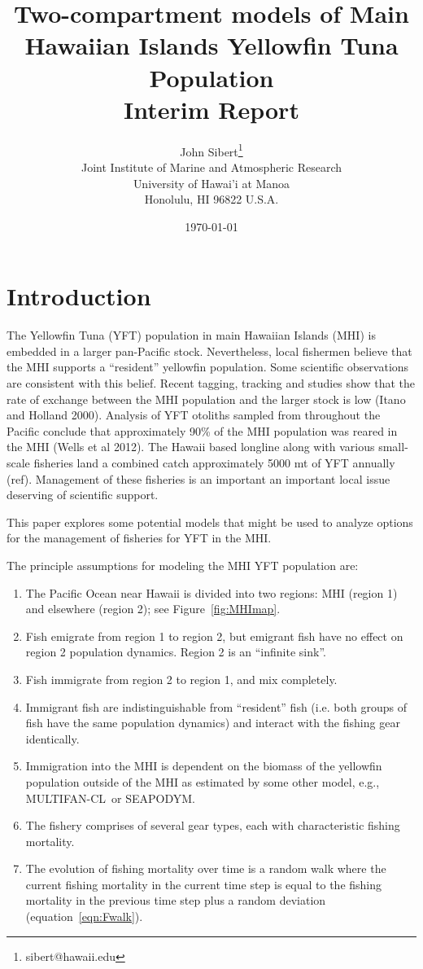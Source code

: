 \documentclass[12pt,letterpaper]{article}
\title{Two-compartment models of Main Hawaiian Islands Yellowfin Tuna
Population\\
Interim Report}
\author{
John Sibert\thanks{sibert@hawaii.edu}\\
Joint Institute of Marine and Atmospheric Research\\
University of Hawai'i at Manoa\\
Honolulu, HI  96822 U.S.A.\\[0.125in]
\date{\today}
}
\newcommand\doublespacing{\baselineskip=1.6\normalbaselineskip}
\newcommand\SD{SEAPODYM}
\newcommand\MFCL{MULTIFAN-CL}
\begin{document}
\maketitle

\doublespacing

\section*{Introduction}
The Yellowfin Tuna (YFT) population in main Hawaiian Islands (MHI) is
embedded in a larger pan-Pacific stock. Nevertheless, local fishermen
believe that the MHI supports a ``resident'' yellowfin population.
Some scientific observations are consistent with this belief. 
Recent tagging, tracking and
studies show that the rate of exchange between the MHI population
and the larger stock is low (Itano and Holland 2000). Analysis
of YFT otoliths sampled from
throughout the Pacific conclude that approximately 90\% of the MHI
population was reared in the MHI (Wells et al 2012).
The Hawaii based longline along with various small-scale fisheries
land a combined catch
approximately 5000 mt of YFT annually (ref). Management of these
fisheries is an important an important  local issue deserving of scientific support.

This paper explores some potential models that might be used to
analyze options for the management of fisheries for YFT in the MHI.

The principle assumptions for modeling the MHI YFT population are:
\begin{enumerate}
\item The Pacific Ocean near Hawaii is divided into two regions:
MHI (region 1) and elsewhere (region 2); see Figure~\ref{fig:MHImap}.
\item Fish emigrate from region 1 to region 2, but emigrant fish have
no effect on region 2 population dynamics. Region 2 is an ``infinite
sink''.
\item Fish immigrate from region 2 to region 1, and mix completely.
\item Immigrant fish are indistinguishable from ``resident'' fish
(i.e. both groups of fish have the same population dynamics) and
interact with the fishing gear identically.
\item Immigration into the MHI is dependent on the
biomass of the yellowfin population outside of the MHI as estimated by
some other model, e.g., \MFCL\ or \SD.
\item The fishery comprises of several gear types, each with characteristic
fishing mortality.
\item The evolution of fishing mortality over time is a random walk
where the current fishing mortality in the current time step is equal
to the fishing mortality in the previous time step plus a random deviation
(equation~\ref{eqn:Fwalk}).
\end{enumerate}
\end{document}
